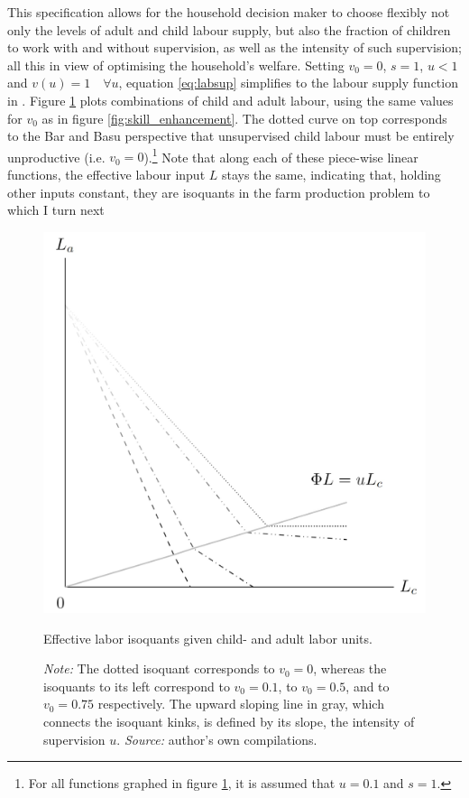 \documentclass[a4paper,12pt]{article}
\theoremstyle{plain}
\theoremstyle{definition}
\theoremstyle{definition}
\theoremstyle{definition}
\theoremstyle{definition}
\begin{document}
This specification allows for the household decision maker to choose flexibly not only the levels of adult and child labour supply, but also the fraction of children to work with and without supervision, as well as the intensity of such supervision; all this in view of optimising the household's welfare. Setting $v_0=0$, $s=1$, $u<1$ and $v(u)=1 \quad \forall u$, equation \ref{eq:labsup} simplifies to the labour supply function in \citet{Bar2009}. Figure \ref{fig:isoq} plots combinations of child and adult labour, using the same values for $v_0$ as in figure \ref{fig:skill_enhancement}. The dotted curve on top corresponds to the Bar and Basu perspective that unsupervised child labour must be entirely unproductive (i.e. $v_0=0$).\footnote{For all functions graphed in figure \ref{fig:isoq}, it is assumed that $u=0.1$ and $s=1$.} Note that along each of these piece-wise linear functions, the effective labour input $L$ stays the same, indicating that, holding other inputs constant, they are isoquants in the farm production problem to which I turn next 

\begin{figure}[H]
\centering
\includegraphics[scale=0.5]{fig_isoquants}
\caption{Effective labor isoquants given child- and adult labor units.}
\caption*{\footnotesize{\textit{Note:} The dotted isoquant corresponds to $v_0=0$, whereas the isoquants to its left correspond to $v_0=0.1$, to $v_0=0.5$, and to $v_0=0.75$ respectively. The upward sloping line in gray, which connects the isoquant kinks, is defined by its slope, the intensity of supervision $u$. \textit{Source:}  author's own compilations.}}
\label{fig:isoq}
\end{figure}
\end{document}
